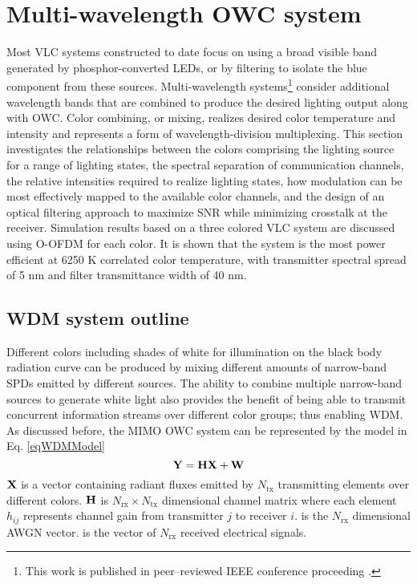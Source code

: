 \section{Multi-wavelength OWC system}
\label{sec:wdmSystem}
\graphicspath{{_System/figures_wdm/}}

Most VLC systems constructed to date focus on using a broad visible band generated by phosphor-converted LEDs, or by filtering to isolate the blue component from these sources. Multi-wavelength systems\footnote{This work is published in peer--reviewed IEEE conference proceeding \cite{but14c}.} consider additional wavelength bands that are combined to produce the desired lighting output along with OWC. Color combining, or mixing, realizes desired color temperature and intensity and represents a form of  wavelength-division multiplexing. This section investigates the relationships between the colors comprising the lighting source for a range of lighting states, the spectral separation of communication channels, the relative intensities required to realize lighting states, how modulation can be most effectively mapped to the available color channels, and the design of an optical filtering approach to maximize SNR while minimizing crosstalk at the receiver. Simulation results based on a three colored VLC system are discussed using O-OFDM for each color. It is shown that the system is the most power efficient at 6250 K correlated color temperature, with transmitter spectral spread of 5 nm and filter transmittance width of 40 nm.

\subsection{WDM system outline}
\label{subsec:wdmSystemWdm}

Different colors including shades of white for illumination on the black body radiation curve can be produced by mixing different amounts of narrow-band SPDs emitted by different sources. The ability to combine multiple narrow-band sources to generate white light also provides the benefit of being able to transmit concurrent information streams over different color groups; thus enabling WDM. As discussed before, the MIMO OWC system can be represented by the model in Eq. \eqref{eqWDMModel}
\begin{equation}
	{\bf{Y}} = {\bf{H}}{\bf{X}} + {\bf{W}}
	\label{eqWDMModel}
\end{equation}
${\bf{X}}$ is a vector containing radiant fluxes emitted by $N_{\text{tx}}$ transmitting elements over different colors. ${\bf{H}}$ is $N_{\text{rx}}\times N_{\text{tx}}$ dimensional channel matrix where each element $h_{ij}$ represents channel gain from transmitter $j$ to receiver $i$.  is the $N_{\text{rx}}$ dimensional AWGN vector.  is the vector of $N_{\text{rx}}$ received electrical signals.

